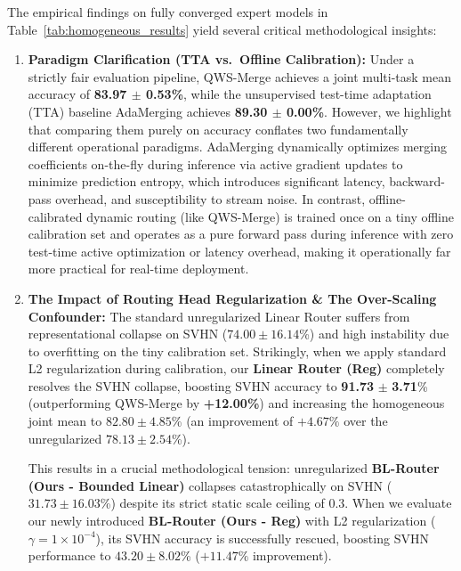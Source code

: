 The empirical findings on fully converged expert models in Table~\ref{tab:homogeneous_results} yield several critical methodological insights:
\begin{enumerate}
    \item \textbf{Paradigm Clarification (TTA vs.\ Offline Calibration):} Under a strictly fair evaluation pipeline, QWS-Merge achieves a joint multi-task mean accuracy of \textbf{83.97 $\pm$ 0.53\%}, while the unsupervised test-time adaptation (TTA) baseline AdaMerging achieves \textbf{89.30 $\pm$ 0.00\%}. However, we highlight that comparing them purely on accuracy conflates two fundamentally different operational paradigms. AdaMerging dynamically optimizes merging coefficients on-the-fly during inference via active gradient updates to minimize prediction entropy, which introduces significant latency, backward-pass overhead, and susceptibility to stream noise. In contrast, offline-calibrated dynamic routing (like QWS-Merge) is trained once on a tiny offline calibration set and operates as a pure forward pass during inference with zero test-time active optimization or latency overhead, making it operationally far more practical for real-time deployment.
    \item \textbf{The Impact of Routing Head Regularization \& The Over-Scaling Confounder:} The standard unregularized Linear Router suffers from representational collapse on SVHN ($74.00 \pm 16.14$\%) and high instability due to overfitting on the tiny calibration set. Strikingly, when we apply standard L2 regularization during calibration, our \textbf{Linear Router (Reg)} completely resolves the SVHN collapse, boosting SVHN accuracy to \textbf{91.73} $\pm$ \textbf{3.71}\% (outperforming QWS-Merge by \textbf{+12.00\%}) and increasing the homogeneous joint mean to $82.80 \pm 4.85$\% (an improvement of $+4.67\%$ over the unregularized $78.13 \pm 2.54$\%). 
    
    This results in a crucial methodological tension: unregularized \textbf{BL-Router (Ours - Bounded Linear)} collapses catastrophically on SVHN ($31.73 \pm 16.03$\%) despite its strict static scale ceiling of 0.3. When we evaluate our newly introduced \textbf{BL-Router (Ours - Reg)} with L2 regularization ($\gamma = 1\times 10^{-4}$), its SVHN accuracy is successfully rescued, boosting SVHN performance to $43.20 \pm 8.02$\% ($+11.47\%$ improvement). 
    

\end{enumerate}
